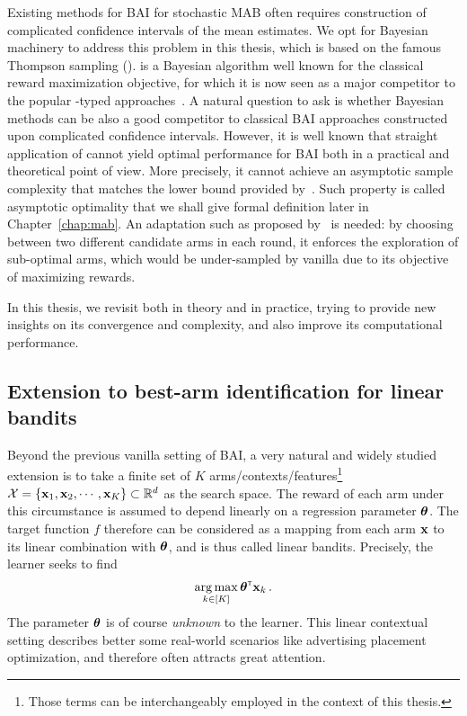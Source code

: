 Existing methods for BAI for stochastic MAB often requires construction of complicated confidence intervals of the mean estimates. We opt for Bayesian machinery to address this problem in this thesis, which is based on the famous Thompson sampling (\TS). \TS is a Bayesian algorithm well known for the classical reward maximization objective, for which it is now seen as a major competitor to the popular \UCB-typed approaches~\citep{auer2002ucb}. A natural question to ask is whether Bayesian methods can be also a good competitor to classical BAI approaches constructed upon complicated confidence intervals. However, it is well known that straight application of \TS cannot yield optimal performance for BAI both in a practical and theoretical point of view. More precisely, it cannot achieve an asymptotic \gls{sample complexity} that matches the lower bound provided by~\cite{garivier2016tracknstop}. Such property is called \gls{asymptotic optimality} that we shall give formal definition later in Chapter~\ref{chap:mab}. An adaptation such as \TTTS proposed by~\cite{russo2016ttts} is needed: by choosing between two different candidate arms in each round, it enforces the exploration of sub-optimal arms, which would be under-sampled by vanilla \TS due to its objective of maximizing rewards. 

In this thesis, we revisit \TTTS both in theory and in practice, trying to provide new insights on its convergence and complexity, and also improve its computational performance.

\subsection{Extension to best-arm identification for linear bandits}\label{sec:intro.mab.linear}

Beyond the previous vanilla setting of BAI, a very natural and widely studied extension is to take a finite set of $K$ arms/contexts/features\footnote{Those terms can be interchangeably employed in the context of this thesis.} $\mathcal{X}=\{{\bf x}_1,{\bf x}_2,\cdots,{\bf x}_K\}\subset\mathbb{R}^d$ as the search space. The reward of each arm under this circumstance is assumed to depend linearly on a \gls{regression parameter} ${\boldsymbol \theta}$. The target function $f$ therefore can be considered as a mapping from each arm ${\bf x}$ to its linear combination with ${\boldsymbol \theta}$, and is thus called linear bandits. Precisely, the learner seeks to find
\begin{align}\label{eq:optim_linbai}
    \operatorname*{arg\,max}_{k\in[K]} {\boldsymbol \theta}^{\mathsf{\scriptscriptstyle T}}{\bf x}_k\,.
\end{align}
The parameter ${\boldsymbol \theta}$ is of course \emph{unknown} to the learner. This linear contextual setting describes better some real-world scenarios like advertising placement optimization, and therefore often attracts great attention.

